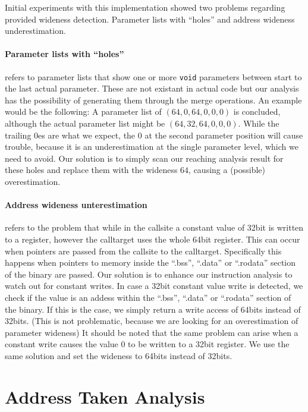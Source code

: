 Initial experiments with this implementation showed two problems regarding provided wideness detection.  Parameter lists with ``holes'' and address wideness underestimation.

\paragraph{Parameter lists with ``holes''} refers to parameter lists that show one or more \texttt{void} parameters between start to the last actual parameter. These are not existant in actual code but our analysis has the possibility of generating them through the merge operations. An example would be the following: A parameter list of $(64, 0, 64, 0, 0, 0)$ is concluded, although the actual parameter list might be $(64, 32, 64, 0, 0, 0)$. While the trailing 0es are what we expect, the 0 at the second parameter position will cause trouble, because it is an underestimation at the single parameter level, which we need to avoid.
Our solution is to simply scan our reaching analysis result for these holes and replace them with the wideness $64$, causing a (possible) overestimation.

\paragraph{Address wideness unterestimation} refers to the problem that while in the callsite a constant value of 32bit is written to a register, however the calltarget uses the whole 64bit register. This can occur when pointers are passed from the callsite to the calltarget. Specifically this happens when pointers to memory inside the ``.bss'', ``.data'' or ``.rodata'' section of the binary are passed.
Our solution is to enhance our instruction analysis to watch out for constant writes. In case a 32bit constant value write is detected, we check if the value is an addess within the ``.bss'', ``.data'' or ``.rodata'' section of the binary. If this is the case, we simply return a write access of 64bits instead of 32bits. (This is not problematic, because we are looking for an overestimation of parameter wideness)
It should be noted that the same problem can arise when a constant write causes the value 0 to be written to a 32bit register. We use the same solution and set the wideness to 64bits instead of 32bits.

\section{Address Taken Analysis}
\label{section:addresstakenanalysis}

